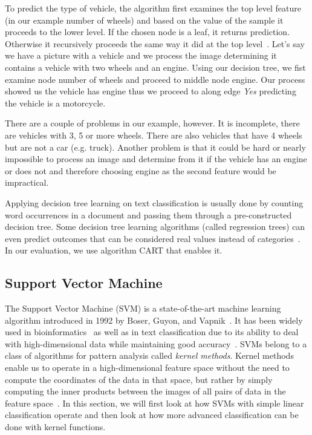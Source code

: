 To predict the type of vehicle, the algorithm first examines the top level feature (in our example number of wheels) and based on the value of the sample it proceeds to the lower level. If the chosen node is a leaf, it returns prediction. Otherwise it recursively proceeds the same way it did at the top level~\cite{mitchell1997machine}. Let's say we have a picture with a vehicle and we process the image determining it contains a vehicle with two wheels and an engine. Using our decision tree, we fist examine node number of wheels and proceed to middle node engine. Our process showed us the vehicle has engine thus we proceed to along edge \textit{Yes} predicting the vehicle is a motorcycle.

There are a couple of problems in our example, however. It is incomplete, there are vehicles with 3, 5 or more wheels. There are also vehicles that have 4 wheels but are not a car (e.g. truck). Another problem is that it could be hard or nearly impossible to process an image and determine from it if the vehicle has an engine or does not and therefore choosing engine as the second feature would be impractical.

Applying decision tree learning on text classification is usually done by counting word occurrences in a document and passing them through a pre-constructed decision tree. Some decision tree learning algorithms (called regression trees) can even predict outcomes that can be considered real values instead of categories~\cite{loh2011cart}. In our evaluation, we use algorithm CART that enables it.

\subsection{Support Vector Machine}

The Support Vector Machine (SVM) is a state-of-the-art machine learning algorithm introduced in 1992 by Boser, Guyon, and Vapnik~\cite{boser1992training}. It has been widely used in bioinformatics~\cite{byvatov2002support} as well as in text classification due to its ability to deal with high-dimensional data while maintaining good accuracy~\cite{joachims1998text}. SVMs belong to a class of algorithms for pattern analysis called \textit{kernel methods}. Kernel methods enable us to operate in a high-dimensional feature space without the need to compute the coordinates of the data in that space, but rather by simply computing the inner products between the images of all pairs of data in the feature space~\cite{Ben-hur}\cite{manning2008introduction}. In this section, we will first look at how SVMs with simple linear classification operate and then look at how more advanced classification can be done with kernel functions.

